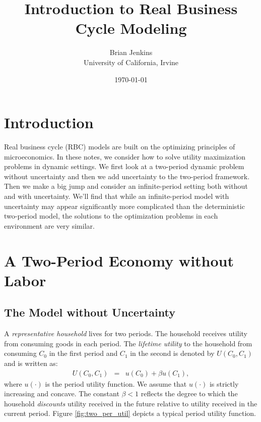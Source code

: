 \documentclass[12pt,fleqn]{article}
\newcommand{\EE}{\begin{eqnarray}}
\newcommand{\FF}{\end{eqnarray}}
\begin{document}
\title{Introduction to Real Business Cycle Modeling}
\author{
Brian Jenkins\\  University of California, Irvine}
\date{\today}

\maketitle


\tableofcontents

\newpage
%

\section{Introduction}

Real business cycle (RBC) models are built on the optimizing principles of microeconomics. In these notes, we consider how to solve utility maximization problems in dynamic settings. We first look at a two-period dynamic problem without uncertainty and then we add uncertainty to the two-period framework. Then we make a big jump and consider an infinite-period setting both without and with uncertainty. We'll find that while an infinite-period model with uncertainty may appear significantly more complicated than the deterministic two-period model, the solutions to the optimization problems in each environment are very similar. 

\section{A Two-Period Economy without Labor}

\subsection{The Model without Uncertainty}

A \emph{representative household} lives for two periods. The household receives utility from consuming goods in each period. The \emph{lifetime utility} to the household from consuming $C_0$ in the first period and $C_1$ in the second is denoted by $U(C_0,C_1)$ and is written as:
	\EE
	U(C_0,C_1) & = & u(C_0) + \beta u(C_1),  \label{eqn:two_per_det_utility}
	\FF
where $u(\cdot)$ is the period utility function. We assume that $u(\cdot)$ is strictly increasing and concave. The constant $\beta<1$ reflects the degree to which the household \emph{discounts} utility received in the future relative to utility received in the current period. Figure \ref{fig:two_per_util} depicts a typical period utility function.
\end{document}
